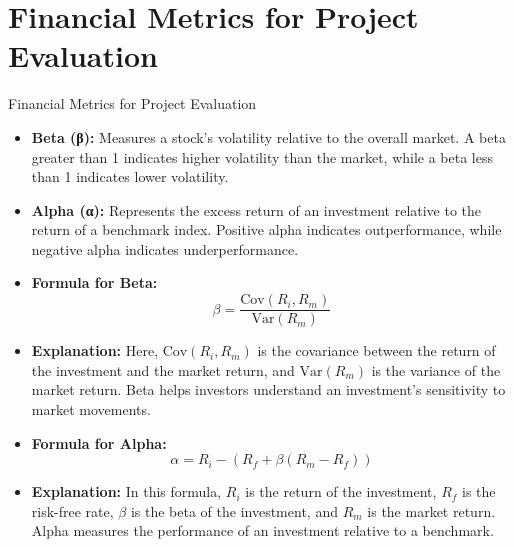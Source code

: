 \documentclass{beamer}
\begin{document}
\section{Financial Metrics for Project Evaluation}
\begin{frame}{Financial Metrics for Project Evaluation}
    \begin{itemize}
        \item \textbf{Beta (β):} Measures a stock's volatility relative to the overall market. A beta greater than 1 indicates higher volatility than the market, while a beta less than 1 indicates lower volatility.
        \item \textbf{Alpha (α):} Represents the excess return of an investment relative to the return of a benchmark index. Positive alpha indicates outperformance, while negative alpha indicates underperformance.
        \item \textbf{Formula for Beta:}
        \begin{equation*}
            \beta = \frac{\text{Cov}(R_i, R_m)}{\text{Var}(R_m)}
        \end{equation*}
        \item \textbf{Explanation:} Here, \( \text{Cov}(R_i, R_m) \) is the covariance between the return of the investment and the market return, and \( \text{Var}(R_m) \) is the variance of the market return. Beta helps investors understand an investment's sensitivity to market movements.
        \item \textbf{Formula for Alpha:}
        \begin{equation*}
            \alpha = R_i - \left( R_f + \beta (R_m - R_f) \right)
        \end{equation*}
        \item \textbf{Explanation:} In this formula, \( R_i \) is the return of the investment, \( R_f \) is the risk-free rate, \( \beta \) is the beta of the investment, and \( R_m \) is the market return. Alpha measures the performance of an investment relative to a benchmark.
    \end{itemize}
\end{frame}
\end{document}
